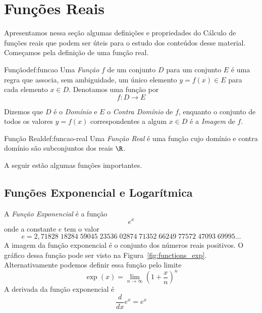 \section{Funções Reais}
\label{sec:Funcoes_Reais}

Apresentamos nessa seção algumas definições e propriedades do Cálculo de
funções reais que podem ser úteis para o estudo dos conteúdos desse material.
Começamos pela definição de uma função real.

\begin{definicao}{Função}{def:funcao}
  Uma \emph{Função} $f$ de um conjunto $D$ para um conjunto $E$
  é uma regra que associa, sem ambiguidade, um único elemento $y=f(x)\in E$
  para cada elemento $x\in D$. Denotamos uma função por
  \[
  f\colon D \to E
  \]
\end{definicao}

Dizemos que $D$ é o \emph{Domínio} e $E$ o
\emph{Contra Domínio} de $f$, enquanto o
conjunto de todos os valores $y=f(x)$ correspondentes a algum $x\in D$ é
a \emph{Imagem} de $f$.

\begin{definicao}{Função Real}{def:funcao-real}
  Uma \emph{Função Real} é uma função cujo domínio e
  contra domínio são subconjuntos dos reais $\R$.
\end{definicao}

A seguir estão algumas funções importantes.

\subsection*{Funções Exponencial e Logarítmica}

A \emph{Função Exponencial} é a função
\[
  e^x
\]
onde a constante $e$ tem o valor
\[
 e = 2,71828\;18284\;59045\;23536\;02874\;71352\;66249\;77572\;47093\;69995\dots
\]
A imagem da função exponencial é o conjunto dos números reais positivos.
O gráfico dessa função pode ser visto na Figura~\ref{fig:functions_exp}.
Alternativamente podemos definir essa função pelo limite
\begin{equation}
  \label{eq:exponencial-pelo-limite}
  \exp(x) = \lim_{n\to\infty} \left( 1 + \frac{x}{n} \right)^n
\end{equation}
A derivada da função exponencial é
\[
  \frac{d}{dx} e^x = e^x
\]

